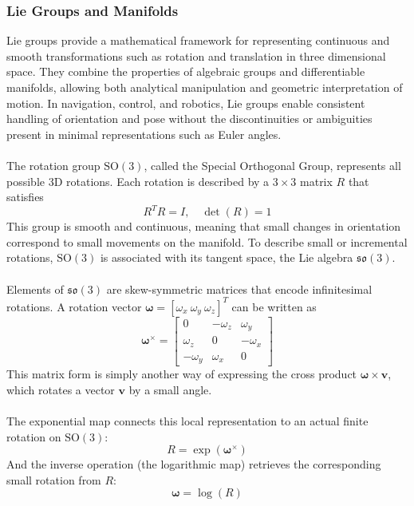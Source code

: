 \subsubsection{Lie Groups and Manifolds}
Lie groups provide a mathematical framework for representing continuous and smooth transformations such as rotation and translation in three dimensional space. They combine the properties of algebraic groups and differentiable manifolds, allowing both analytical manipulation and geometric interpretation of motion. In navigation, control, and robotics, Lie groups enable consistent handling of orientation and pose without the discontinuities or ambiguities present in minimal representations such as Euler angles.  
\\ \\
The rotation group $\mathrm{SO}(3)$, called the Special Orthogonal Group, represents all possible 3D rotations. Each rotation is described by a $3\times3$ matrix $R$ that satisfies
$$
    R^T R = I, \quad \det(R) = 1
$$
This group is smooth and continuous, meaning that small changes in orientation correspond to small movements on the manifold. To describe small or incremental rotations, $\mathrm{SO}(3)$ is associated with its tangent space, the Lie algebra $\mathfrak{so}(3)$.  
\\ \\
Elements of $\mathfrak{so}(3)$ are skew-symmetric matrices that encode infinitesimal rotations. A rotation vector $\boldsymbol{\omega} = [\omega_x~\omega_y~\omega_z]^T$ can be written as
$$
    \boldsymbol{\omega}^\times =
    \begin{bmatrix}
        0 & -\omega_z & \omega_y \\
        \omega_z & 0 & -\omega_x \\
        -\omega_y & \omega_x & 0
    \end{bmatrix}
$$
This matrix form is simply another way of expressing the cross product $\boldsymbol{\omega} \times \mathbf{v}$, which rotates a vector $\mathbf{v}$ by a small angle.  
\\ \\
The exponential map connects this local representation to an actual finite rotation on $\mathrm{SO}(3)$:
\begin{equation}
    R = \exp(\boldsymbol{\omega}^\times)
    \label{eq:lie-groups-and-manifold-exponential}
\end{equation}
And the inverse operation (the logarithmic map) retrieves the corresponding small rotation from $R$:
\begin{equation}
    \boldsymbol{\omega} = \log(R)
    \label{eq:lie-groups-and-manifold-logarithmic}
\end{equation}
